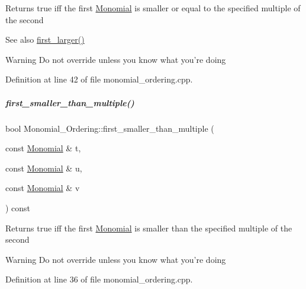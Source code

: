 \begin{DoxyReturn}{Returns}
{\ttfamily true} iff the first \hyperlink{group__polygroup_class_monomial}{Monomial} is smaller or equal to the specified multiple of the second 
\end{DoxyReturn}
\begin{DoxySeeAlso}{See also}
\hyperlink{group__orderinggroup_aed41fe82e1ca5cd287a93d287fee7c20}{first\+\_\+larger()} 
\end{DoxySeeAlso}
\begin{DoxyWarning}{Warning}
Do not override unless you know what you're doing 
\end{DoxyWarning}


Definition at line 42 of file monomial\+\_\+ordering.\+cpp.

\mbox{\label{group__orderinggroup_aad1ca67ca89fa85e63475d24d9f0a987}} 
\subparagraph{\texorpdfstring{first\+\_\+smaller\+\_\+than\+\_\+multiple()}{first\_smaller\_than\_multiple()}}
{\footnotesize\ttfamily bool Monomial\+\_\+\+Ordering\+::first\+\_\+smaller\+\_\+than\+\_\+multiple (\begin{DoxyParamCaption}\item[{const \hyperlink{group__polygroup_class_monomial}{Monomial} \&}]{t,  }\item[{const \hyperlink{group__polygroup_class_monomial}{Monomial} \&}]{u,  }\item[{const \hyperlink{group__polygroup_class_monomial}{Monomial} \&}]{v }\end{DoxyParamCaption}) const}

\begin{DoxyReturn}{Returns}
{\ttfamily true} iff the first \hyperlink{group__polygroup_class_monomial}{Monomial} is smaller than the specified multiple of the second 
\end{DoxyReturn}
\begin{DoxyWarning}{Warning}
Do not override unless you know what you're doing 
\end{DoxyWarning}


Definition at line 36 of file monomial\+\_\+ordering.\+cpp.

